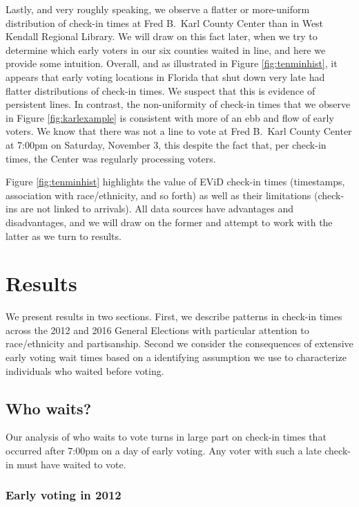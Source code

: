 \documentclass[12pt,titlepage]{article}
\begin{document}
Lastly, and very roughly speaking, we observe a flatter or
more-uniform distribution of check-in times at Fred B.\ Karl County
Center than in West Kendall Regional Library.  We will draw on this
fact later, when we try to determine which early voters in our six
counties waited in line, and here we provide some intuition.  Overall,
and as illustrated in Figure \ref{fig:tenminhist}, it appears that
early voting locations in Florida that shut down very late had flatter
distributions of check-in times.  We suspect that this is evidence of
persistent lines.  In contrast, the non-uniformity of check-in times
that we observe in Figure \ref{fig:karlexample} is consistent with
more of an ebb and flow of early voters.  We know that there was not a
line to vote at Fred B.\ Karl County Center at 7:00pm on Saturday,
November 3, this despite the fact that, per check-in times, the Center
was regularly processing voters.

Figure \ref{fig:tenminhist} highlights the value of EViD check-in
times (timestamps, association with race/ethnicity, and so forth) as
well as their limitations (check-ins are not linked to arrivals).  All
data sources have advantages and disadvantages, and we will draw on
the former and attempt to work with the latter as we turn to results.

\section*{Results}

We present results in two sections.  First, we describe patterns in
check-in times across the 2012 and 2016 General Elections with
particular attention to race/ethnicity and partisanship.  Second we
consider the consequences of extensive early voting wait times based
on a identifying assumption we use to characterize individuals who
waited before voting.

\subsection*{Who waits?}

Our analysis of who waits to vote turns in large part on check-in
times that occurred after 7:00pm on a day of early voting.  Any voter
with such a late check-in must have waited to vote.

\subsubsection*{Early voting in 2012}
\end{document}
